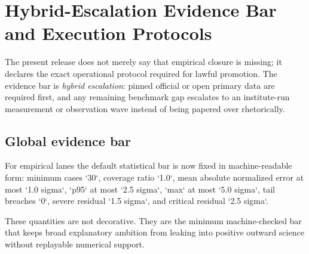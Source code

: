 \section{Hybrid-Escalation Evidence Bar and Execution Protocols}

The present release does not merely say that empirical closure is missing; it declares the exact operational protocol required for lawful promotion.
The evidence bar is \emph{hybrid escalation}: pinned official or open primary data are required first, and any remaining benchmark gap escalates to an institute-run measurement or observation wave instead of being papered over rhetorically.

\subsection{Global evidence bar}
For empirical lanes the default statistical bar is now fixed in machine-readable form: minimum cases `30`, coverage ratio `1.0`, mean absolute normalized error at most `1.0 sigma`, `p95` at most `2.5 sigma`, `max` at most `5.0 sigma`, tail breaches `0`, severe residual `1.5 sigma`, and critical residual `2.5 sigma`.

These quantities are not decorative. They are the minimum machine-checked bar that keeps broad explanatory ambition from leaking into positive outward science without replayable numerical support.


